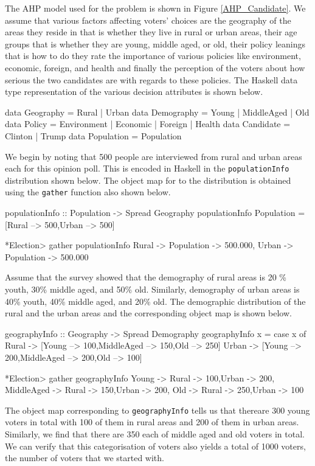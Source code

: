 \documentclass{jfp}
\newcommand{\prog}[1]{\texttt{#1}}
\begin{document}
The AHP model used for the problem is shown in Figure \ref{AHP_Candidate}. We assume that various factors affecting voters' choices are the geography of the areas they reside in that is whether they live in rural or urban areas, their age groups that is whether they are young, middle aged, or old, their policy leanings that is how to do they rate the importance of various policies like environment, economic, foreign, and health and finally the perception of the voters about how serious the two candidates are with regards to these policies. The Haskell data type representation of the various decision attributes is shown below.
\begin{haskellcode}
data Geography = Rural | Urban 
data Demography = Young | MiddleAged | Old 
data Policy = Environment | Economic | Foreign | Health 
data Candidate = Clinton | Trump 
data Population  = Population 
\end{haskellcode}
We begin by noting that 500 people are interviewed from rural and urban areas each for this opinion poll. This is encoded in Haskell in the \prog{populationInfo} distribution shown below. The object map for to the distribution is obtained using the \prog{gather} function also shown below. 
\begin{haskellcode}
populationInfo :: Population -> Spread Geography 
populationInfo Population = [Rural --> 500,Urban --> 500]

*Election> gather populationInfo
{Rural -> {Population -> 500.000},
 Urban -> {Population -> 500.000}}
\end{haskellcode}
Assume that the survey showed that the demography of rural areas is 20 \% youth, 30\% middle aged, and 50\% old. Similarly, demography of urban areas is 40\% youth, 40\% middle aged, and 20\% old. The demographic distribution of the rural and the urban areas and the corresponding object map is shown below. 
\begin{haskellcode}
geographyInfo :: Geography -> Spread Demography 
geographyInfo x = case x of
                      Rural -> [Young --> 100,MiddleAged --> 150,Old --> 250]
                      Urban -> [Young --> 200,MiddleAged --> 200,Old --> 100]
          
*Election> gather geographyInfo
{Young -> {Rural -> 100,Urban -> 200},
 MiddleAged -> {Rural -> 150,Urban -> 200},
 Old -> {Rural -> 250,Urban -> 100}}
\end{haskellcode}
The object map corresponding to \prog{geographyInfo} tells us that thereare  300 young voters in total with 100 of them in rural areas and 200 of them in urban areas. Similarly, we find that there are 350 each of middle aged and old voters in total. We can verify that this categorisation of voters also yields a total of 1000 voters, the number of voters that we started with.
\end{document}

